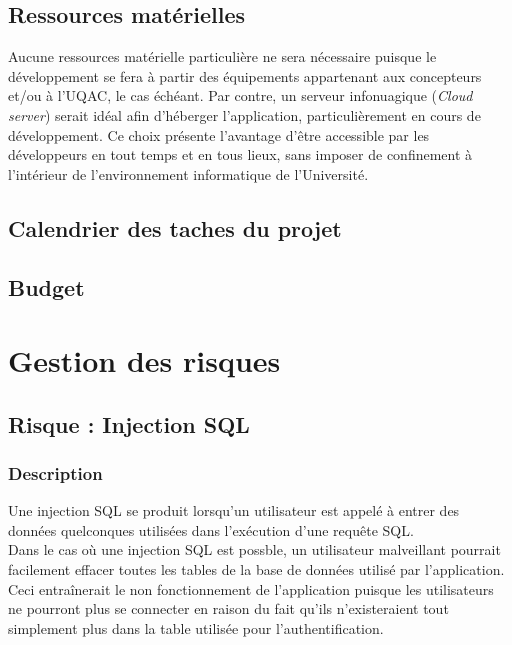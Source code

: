 \documentclass[12pt]{article}
\begin{document}
\subsection{Ressources matérielles}

Aucune ressources matérielle particulière ne sera nécessaire puisque le développement se fera à partir des équipements appartenant aux concepteurs et/ou à l'UQAC, le cas échéant.  Par contre, un serveur infonuagique (\textit{Cloud server}) serait idéal afin d'héberger l'application, particulièrement en cours de développement.  Ce choix présente l'avantage d'être accessible par les développeurs en tout temps et en tous lieux, sans imposer de confinement à l'intérieur de l'environnement informatique de l'Université.

\subsection{Calendrier des taches du projet}

\subsection{Budget}

\newpage

\section{Gestion des risques}


\subsection{Risque : Injection SQL}

\subsubsection*{Description}

Une injection SQL se produit lorsqu'un utilisateur est appelé à entrer des données quelconques
utilisées dans l'exécution d'une requête SQL. \\

Dans le cas où une injection SQL est possble, un utilisateur malveillant pourrait
facilement effacer toutes les tables de la base de données utilisé par l'application.
Ceci entraînerait le non fonctionnement de l'application puisque les utilisateurs
ne pourront plus se connecter en raison du fait qu'ils n'existeraient tout simplement
plus dans la table utilisée pour l'authentification.
\end{document}
